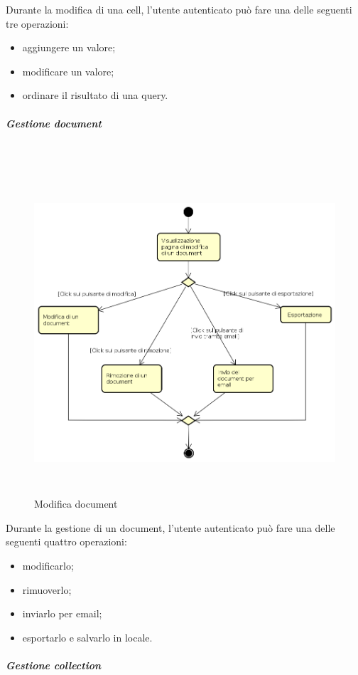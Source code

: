Durante la modifica di una cell, l'utente autenticato può fare una delle seguenti tre operazioni:
\begin{itemize}
\item aggiungere un valore;
\item modificare un valore;
\item ordinare il risultato di una query.
\end{itemize}
\subparagraph{Gestione document} \mbox{} \\
\begin{figure}[H]
\begin{center}
\includegraphics[height=12cm]{res/sections/backend/activities/modificaDocument.png}
\caption{Modifica document}
\end{center}
\end{figure}
Durante la gestione di un document, l'utente autenticato può fare una delle seguenti quattro operazioni:
\begin{itemize}
\item modificarlo;
\item rimuoverlo;
\item inviarlo per email;
\item esportarlo e salvarlo in locale.
\end{itemize}
\subparagraph{Gestione collection} \mbox{} \\
